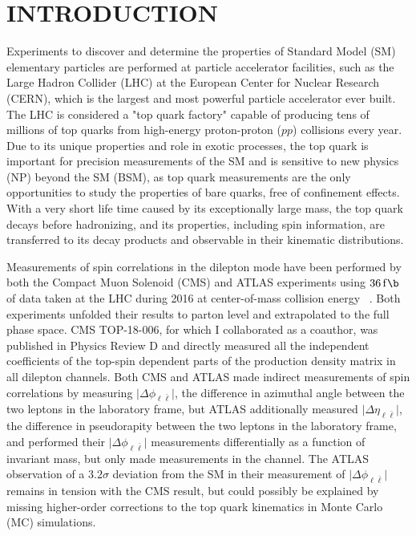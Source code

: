
\chapter*{INTRODUCTION}
\label{Introduction}
Experiments to discover and determine the properties of Standard Model (SM) elementary particles are performed at particle accelerator facilities, such as the Large Hadron Collider (LHC) at the European Center for Nuclear Research (CERN), which is the largest and most powerful particle accelerator ever built.
The LHC is considered a "top quark factory" capable of producing tens of millions of top quarks from high-energy proton-proton ($pp$) collisions every year.
Due to its unique properties and role in exotic processes, the top quark is important for precision measurements of the SM and is sensitive to new physics (NP) beyond the SM (BSM), as top quark measurements are the only opportunities to study the properties of bare quarks, free of confinement effects.
With a very short life time caused by its exceptionally large mass, the top quark decays before hadronizing, and its properties, including spin information, are transferred to its decay products and observable in their kinematic distributions.

Measurements of \ttbar spin correlations in the dilepton mode have been performed by both the Compact Muon Solenoid (CMS) and ATLAS experiments using $\SI{36}{\femto \b}$ of data taken at the LHC during 2016 at center-of-mass collision energy \beamenergy~\cite{arxiv.1905.08634}\cite{Sirunyan:2681777}\cite{Aaboud:2667501}.
Both experiments unfolded their results to parton level and extrapolated to the full phase space.
CMS TOP-18-006, for which I collaborated as a coauthor, was published in Physics Review D and directly measured all the independent coefficients of the top-spin dependent parts of the \ttbar production density matrix in all dilepton channels.
Both CMS and ATLAS made indirect measurements of \ttbar spin correlations by measuring $\vert \Delta\phi_{\ell\bar{\ell}} \vert$, the difference in azimuthal angle between the two leptons in the laboratory frame, but ATLAS additionally measured $\vert \Delta\eta_{\ell\bar{\ell}} \vert$, the difference in pseudorapity between the two leptons in the laboratory frame, and performed their $\vert \Delta\phi_{\ell\bar{\ell}} \vert$ measurements differentially as a function of \ttbar invariant mass, but only made measurements in the \emu channel.
The ATLAS observation of a $3.2 \sigma$ deviation from the SM in their measurement of $\vert \Delta\phi_{\ell\bar{\ell}} \vert$ remains in tension with the CMS result, but could possibly be explained by missing higher-order corrections to the top quark kinematics in Monte Carlo (MC) simulations.

